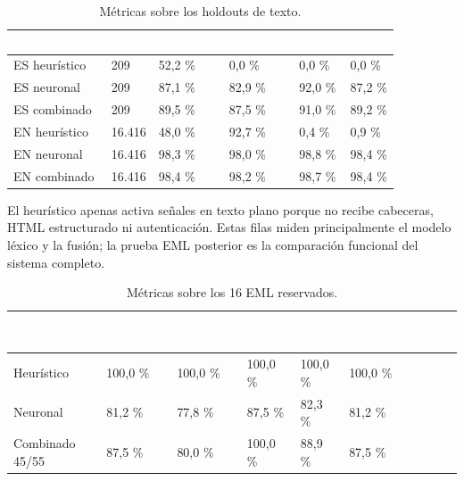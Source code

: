 \documentclass[11pt,a4paper,oneside]{report}
\begin{document}
\begingroup
\begin{table}[H]
  \centering
  \small
  \caption{Métricas sobre los holdouts de texto.}
  \label{tab:6-2}
  \begin{tabularx}{\textwidth}{|X|X|X|X|X|X|}
    \hline
    \rowcolor{uemcgreen}
    \textcolor{white}{\textbf{Idioma/modo}} & \textcolor{white}{\textbf{N}} & \textcolor{white}{\textbf{Accuracy}} & \textcolor{white}{\textbf{Precisión}} & \textcolor{white}{\textbf{Recall}} & \textcolor{white}{\textbf{F1}} \\
    \hline
    ES heurístico & 209 & 52,2 \% & 0,0 \% & 0,0 \% & 0,0 \% \\
    \hline
    \rowcolor{tablelight}
    ES neuronal & 209 & 87,1 \% & 82,9 \% & 92,0 \% & 87,2 \% \\
    \hline
    ES combinado & 209 & 89,5 \% & 87,5 \% & 91,0 \% & 89,2 \% \\
    \hline
    \rowcolor{tablelight}
    EN heurístico & 16.416 & 48,0 \% & 92,7 \% & 0,4 \% & 0,9 \% \\
    \hline
    EN neuronal & 16.416 & 98,3 \% & 98,0 \% & 98,8 \% & 98,4 \% \\
    \hline
    \rowcolor{tablelight}
    EN combinado & 16.416 & 98,4 \% & 98,2 \% & 98,7 \% & 98,4 \% \\
    \hline
  \end{tabularx}
\end{table}
\endgroup

El heurístico apenas activa señales en texto plano porque no recibe cabeceras, HTML estructurado ni autenticación. Estas filas miden principalmente el modelo léxico y la fusión; la prueba EML posterior es la comparación funcional del sistema completo.

\begingroup
\begin{table}[H]
  \centering
  \small
  \caption{Métricas sobre los 16 EML reservados.}
  \label{tab:6-3}
  \begin{tabularx}{\textwidth}{|X|X|X|X|X|X|}
    \hline
    \rowcolor{uemcgreen}
    \textcolor{white}{\textbf{Modo}} & \textcolor{white}{\textbf{Accuracy}} & \textcolor{white}{\textbf{Precisión}} & \textcolor{white}{\textbf{Recall}} & \textcolor{white}{\textbf{F1}} & \textcolor{white}{\textbf{Accuracy balanceada}} \\
    \hline
    Heurístico & 100,0 \% & 100,0 \% & 100,0 \% & 100,0 \% & 100,0 \% \\
    \hline
    \rowcolor{tablelight}
    Neuronal & 81,2 \% & 77,8 \% & 87,5 \% & 82,3 \% & 81,2 \% \\
    \hline
    Combinado 45/55 & 87,5 \% & 80,0 \% & 100,0 \% & 88,9 \% & 87,5 \% \\
    \hline
  \end{tabularx}
\end{table}
\endgroup
\end{document}
